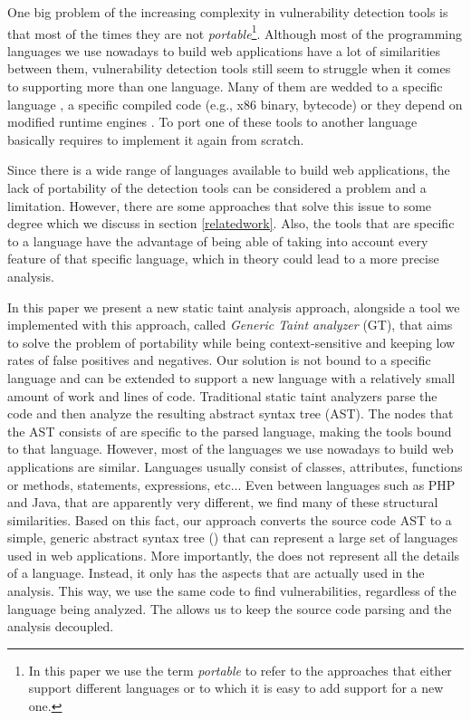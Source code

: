 One big problem of the increasing complexity in vulnerability detection tools is that most of the times they are not \textit{portable}\footnote{In this paper we use the term \textit{portable} to refer to the approaches that either support different languages or to which it is easy to add support for a new one.}. Although most of the programming languages we use nowadays to build web applications have a lot of similarities between them, vulnerability detection tools still seem to struggle when it comes to supporting more than one language. Many of them are wedded to a specific language \cite{diglossia,phpapis,jovanovic2006pixy, arzt2014flowdroid,nunes2015phpsafe,wassermann2008static, dahse2014simulation,livshits2005finding}, a specific compiled code \cite{dytan,taintcheck,dt++} (e.g., x86 binary, bytecode) or they depend on modified runtime engines \cite{diglossia,phosphor}. To port one of these tools to another language basically requires to implement it again from scratch. 

Since there is a wide range of languages available to build web applications, the lack of portability of the detection tools can be considered a problem and a limitation. However, there are some approaches that solve this issue to some degree which we discuss in section \ref{relatedwork}. Also, the tools that are specific to a language have the advantage of being able of taking into account every feature of that specific language, which in theory could lead to a more precise analysis.

In this paper we present a new static taint analysis approach, alongside a tool we implemented with this approach, called {\it Generic Taint analyzer} (GT), that aims to solve the problem of portability while being context-sensitive and keeping low rates of false positives and negatives. Our solution is not bound to a specific language and can be extended to support a new language with a relatively small amount of work and lines of code. 
Traditional static taint analyzers parse the code and then analyze the resulting abstract syntax tree (AST). The nodes that the AST consists of are specific to the parsed language, making the tools bound to that language. However, most of the languages we use nowadays to build web applications are similar. Languages usually consist of classes, attributes, functions or methods, statements, expressions, etc... Even between languages such as PHP and Java, that are apparently very different, we find many of these structural similarities. Based on this fact, our approach converts the source code AST to a simple, generic abstract syntax tree (\astname{}) that can represent a large set of languages used in web applications. More importantly, the \astname{} does not represent all the details of a language. Instead, it only has the aspects that are actually used in the analysis. This way, we  use the same code to find vulnerabilities, regardless of the language being analyzed. The \astname{} allows us to keep the source code parsing and the analysis decoupled.

